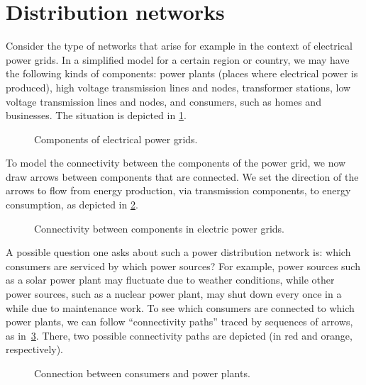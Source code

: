 
\section{Distribution networks}\label{sec:connection-distribution-networks}
Consider the type of networks that arise for example in the context of electrical power grids.
In a simplified model for a certain region or country, we may have the following kinds of components: power plants (places where electrical power is produced), high voltage transmission lines and nodes, transformer stations, low voltage transmission lines and nodes, and consumers, such as homes and businesses.
The situation is depicted in \cref{fig:power_nodes}.

\begin{figure}[p]
    \centering
    \caption{Components of electrical power grids.}
    \label{fig:power_nodes}
\end{figure}

To model the connectivity between the components of the power grid, we now draw arrows between components that are connected.
We set the direction of the arrows to flow from energy production, via transmission components, to energy consumption, as depicted in \cref{fig:power_nodes_connected}.
\begin{figure}[p]
    \centering
    \caption{Connectivity between components in electric power grids.}
    \label{fig:power_nodes_connected}
\end{figure}

A possible question one asks about such a power distribution network is: which consumers are serviced by which power sources?
For example, power sources such as a solar power plant may fluctuate due to weather conditions, while other power sources, such as a nuclear power plant, may shut down every once in a while due to maintenance work.
To see which consumers are connected to which power plants, we can follow ``connectivity paths'' traced by sequences of arrows, as in~\cref{fig:power_paths}.
There, two possible connectivity paths are depicted (in red and orange, respectively).

\begin{figure}[p]
    \centering
    \caption{Connection between consumers and power plants.}
    \label{fig:power_paths}
\end{figure}

